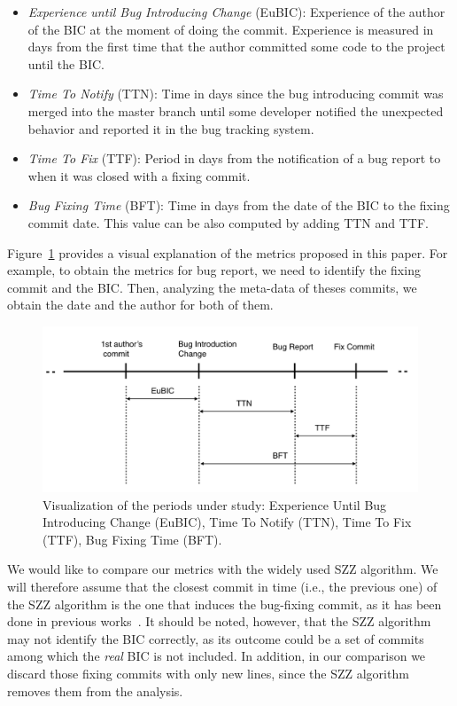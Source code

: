 \documentclass[10pt, conference]{IEEEtran}
\begin{document}
\begin{itemize}
		\item \emph{Experience until Bug Introducing Change} (EuBIC): Experience of the author of the BIC at the moment of doing the commit. Experience is measured in days from the first time that the author committed some code to the project until the BIC.
		\item \emph{Time To Notify} (TTN): Time in days since the bug introducing commit was merged into the master branch until some developer notified the unexpected behavior and reported it in the bug tracking system. 
		\item \emph{Time To Fix} (TTF): Period in days from the notification of a bug report to when it was closed with a fixing commit.
		\item \emph{Bug Fixing Time} (BFT): Time in days from the date of the BIC to the fixing commit date. This value can be also computed by adding TTN and TTF.
\end{itemize} 

Figure~\ref{fig:metrics} provides a visual explanation of the metrics proposed in this paper. For example, to obtain the metrics for bug report, we need to identify the fixing commit and the BIC. Then, analyzing the meta-data of theses commits, we obtain the date and the author for both of them.

\begin{figure}[ht]
\centering
\includegraphics[width=\columnwidth]{metrics.png}
\caption{Visualization of the periods under study: Experience Until Bug Introducing Change (EuBIC),  Time To Notify (TTN), Time To Fix (TTF), Bug Fixing Time (BFT).}
\label{fig:metrics}       %
\end{figure}

We would like to compare our metrics with the widely used SZZ algorithm. We will therefore assume that the closest commit in time (i.e., the previous one) of the SZZ algorithm is the one that induces the bug-fixing commit, as it has been done in previous works~\cite{eyolfson2011time}. It should be noted, however, that the SZZ algorithm may not identify the BIC correctly, as its outcome could be a set of commits among which the \emph{real} BIC is not included. In addition, in our comparison we discard those fixing commits with only new lines, since the SZZ algorithm removes them from the analysis.
\end{document}
